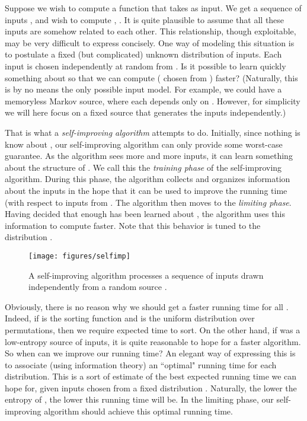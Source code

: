 \documentclass{siamltex}
\begin{document}
Suppose we wish to compute a function  that takes
 as input. We get a sequence of inputs , and
wish to compute , .
It is quite plausible to assume that all these inputs
are somehow related to each other.
This relationship, though exploitable, may be very difficult
to express concisely.
One way of modeling this situation is to postulate
a fixed (but complicated) unknown distribution  of inputs.
Each input  is chosen independently at random from .
Is it possible to learn quickly something about 
so that we can compute  ( chosen from ) faster?
(Naturally, this is by no means the only possible input model. 
For	 example, we could have
a memoryless Markov source, where each  depends only
on . However, for simplicity we will
here focus on a fixed source that generates the
inputs independently.)

That is what a \emph{self-improving algorithm} attempts to do.
Initially, since nothing is know about , our 
self-improving algorithm can only provide some worst-case guarantee. 
As the algorithm sees more and more inputs, it can learn something about
the structure of . We call this
the \emph{training phase} of the self-improving algorithm.
During this phase, the algorithm collects and organizes information
about the inputs in the hope that it can be used
to improve the running time (with respect to inputs
from . The algorithm then moves to the \emph{limiting phase}.
Having decided that enough has been learned about ,
the algorithm uses this information to compute 
faster. Note that this behavior is tuned to the distribution .
\begin{figure}
\begin{center}
\texttt{[image: figures/selfimp]}
\end{center}
\caption{A self-improving algorithm  processes a sequence 
 of inputs drawn independently from a random source
.}
\end{figure}

Obviously, there is no reason why we should get a faster running time
for all . Indeed, if  is the sorting function and  is the 
uniform distribution over permutations, then we require expected 
 time to sort. 
On the other hand, if  was a low-entropy source of inputs, 
it is quite reasonable to hope for a faster algorithm. 
So when can we improve our running time? An elegant way of expressing
this is to associate (using information theory) an ``optimal"
running time for each distribution. This is a sort of estimate
of the best expected running time we can hope for, given
inputs chosen from a fixed distribution . Naturally, the lower
the entropy of , the lower this running time will be.
In the limiting phase, our self-improving algorithm should achieve
this optimal running time.
\end{document}
